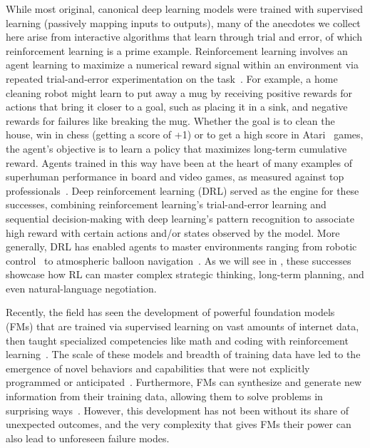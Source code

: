 \documentclass[10pt]{article}
\def\citep#1{}%
\begin{document}
While most original, canonical deep learning models were trained with supervised learning (passively mapping inputs to outputs), many of the anecdotes we collect here arise from interactive algorithms that learn through trial and error, of which reinforcement learning is a prime example.
Reinforcement learning involves an agent learning to maximize a numerical reward signal within an environment via repeated trial-and-error experimentation on the task~\citep{sutton2018reinforcement}.
For example, a home cleaning robot might learn to put away a mug by receiving positive rewards for actions that bring it closer to a goal, such as placing it in a sink, and negative rewards for failures like breaking the mug. 
Whether the goal is to clean the house, win in chess (getting a score of +1) or to get a high score in Atari~\citep{mnih2015human} games, the agent's objective is to learn a policy that maximizes long-term cumulative reward.
Agents trained in this way have been at the heart of many examples of superhuman performance in board and video games, as measured against top professionals~\citep{silver2017mastering, Vinyals2019Alphastar, openai2019dota2largescale, bakhtin2022masteringgamenopressdiplomacy, BrownLibratus2017, wurman2022outracing}. 
Deep reinforcement learning (DRL) served as the engine for these successes, combining reinforcement learning's trial-and-error learning and sequential decision-making with deep learning's pattern recognition to associate high reward with certain actions and/or states observed by the model.
More generally, DRL has enabled agents to master environments ranging from robotic control~\citep{levine2016end} to atmospheric balloon navigation~\citep{schuler2025seasonalstationkeepingshortduration, bellemare2020balloonnavigation}.
As we will see in , these successes showcase how RL can master complex strategic thinking, long-term planning, and even natural-language negotiation.

Recently, the field has seen the development of powerful foundation models (FMs) that are trained via supervised learning on vast amounts of internet data, then taught specialized competencies like math and coding with reinforcement learning~\citep{wen2025reinforcementlearningverifiablerewards, deepseekai2025deepseekv3technicalreport, su2025crossingrewardbridgeexpanding, chen2021evaluatinglargelanguagemodels}. 
The scale of these models and breadth of training data have led to the emergence of novel behaviors and capabilities that were not explicitly programmed or anticipated~\citep{comanici2025gemini, openai_gpt3.5, claude3family, grattafiori2024llama3herdmodels}.
Furthermore, FMs can synthesize and generate new information from their training data, allowing them to solve problems in surprising ways~\citep{brown2020languagemodelsfewshotlearners, perez2022discoveringlanguagemodelbehaviors}.
However, this development has not been without its share of unexpected outcomes, and the very complexity that gives FMs their power can also lead to unforeseen failure modes.
\end{document}
